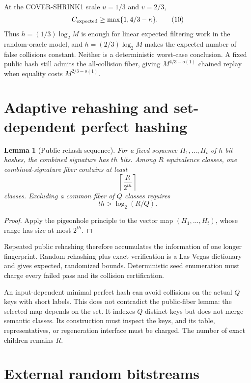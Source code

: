 \documentclass[11pt]{article}
\newtheorem{lemma}[theorem]{Lemma}
\begin{document}
At the COVER-SHRINK1 scale $u=1/3$ and $v=2/3$,
\[
 C_{\rm expected}\ge\max\{1,4/3-\kappa\}.
 \tag{10}
\]
Thus $h=(1/3)\log_2M$ is enough for linear expected filtering work in the
random-oracle model, and $h=(2/3)\log_2M$ makes the expected number of false
collisions constant.  Neither is a deterministic worst-case conclusion.  A
fixed public hash still admits the all-collision fiber, giving
$M^{4/3-o(1)}$ chained replay when equality costs $M^{2/3-o(1)}$.

\section{Adaptive rehashing and set-dependent perfect hashing}

\begin{lemma}[Public rehash sequence]
For a fixed sequence $H_1,\ldots,H_t$ of $h$-bit hashes, the combined
signature has $th$ bits.  Among $R$ equivalence classes, one combined-signature
fiber contains at least
\[
 \left\lceil\frac{R}{2^{th}}\right\rceil
 \tag{11}
\]
classes.  Excluding a common fiber of $Q$ classes requires
\[
 th>\log_2(R/Q).
 \tag{12}
\]
\end{lemma}

\begin{proof}
Apply the pigeonhole principle to the vector map
$(H_1,\ldots,H_t)$, whose range has size at most $2^{th}$.
\end{proof}

Repeated public rehashing therefore accumulates the information of one longer
fingerprint.  Random rehashing plus exact verification is a Las Vegas
dictionary and gives expected, randomized bounds.  Deterministic seed
enumeration must charge every failed pass and its collision certification.

An input-dependent minimal perfect hash can avoid collisions on the actual
$Q$ keys with short labels.  This does not contradict the public-fiber lemma:
the selected map depends on the set.  It indexes $Q$ distinct keys but does
not merge semantic classes.  Its construction must inspect the keys, and its
table, representatives, or regeneration interface must be charged.  The
number of exact children remains $R$.

\section{External random bitstreams}
\end{document}
